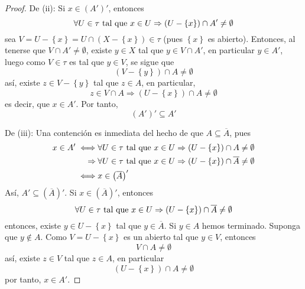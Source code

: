 \documentclass[12pt]{report}
\theoremstyle{largebreak}
\newcommand{\Cls}[1]{\ensuremath{\overline{#1}}}
\begin{document}
\begin{proof}
        De (ii): Si $x\in\left(A'\right)'$, entonces
        \begin{equation*}
            \forall U\in\tau\textup{ tal que }x\in U\Rightarrow \left(U-\left\{x\right\} \right)\cap A'\neq\emptyset
        \end{equation*}
        sea $V=U-\left\{x\right\}=U\cap(X-\left\{x\right\})\in\tau$ (pues $\left\{x\right\}$ es abierto). Entonces, al tenerse que $V\cap A'\neq\emptyset$, existe $y\in X$ tal que $y\in V\cap A'$, en particular $y\in A'$, luego como $V\in\tau$ es tal que $y\in V$, se sigue que
        \begin{equation*}
            (V-\left\{y\right\})\cap A\neq\emptyset
        \end{equation*} 
        así, existe $z\in V-\left\{y\right\}$ tal que $z\in A$, en particular,
        \begin{equation*}
            z\in V\cap A\Rightarrow (U-\left\{x\right\})\cap A\neq\emptyset
        \end{equation*}
        es decir, que $x\in A'$. Por tanto,
        \begin{equation*}
            \left(A'\right)'\subseteq A'
        \end{equation*}

        De (iii): Una contención es inmediata del hecho de que $A\subseteq\Cls{A}$, pues
        \begin{equation*}
            \begin{split}
                x\in A'\iff& \forall U\in\tau\textup{ tal que }x\in U\Rightarrow (U-\left\{x\right\})\cap A\neq\emptyset\\
                \Rightarrow\:&\forall U\in\tau\textup{ tal que }x\in U\Rightarrow (U-\left\{x\right\})\cap\Cls{A}\neq\emptyset\\
                \iff& x\in\left(\Cls{A}\right)'\\
            \end{split}
        \end{equation*}
        Así, $A'\subseteq\left(\Cls{A}\right)'$. Si $x\in\left(\Cls{A}\right)'$, entonces
        \begin{equation*}
            \forall U\in\tau\textup{ tal que }x\in U\Rightarrow (U-\left\{x\right\})\cap\Cls{A}\neq\emptyset
        \end{equation*}
        entonces, existe $y\in U-\left\{x\right\}$ tal que $y\in\Cls{A}$. Si $y\in A$ hemos terminado. Suponga que $y\notin A$. Como $V=U-\left\{x\right\}$ es un abierto tal que $y\in V$, entonces
        \begin{equation*}
            V\cap A\neq\emptyset
        \end{equation*}
        así, existe $z\in V$ tal que $z\in A$, en particular
        \begin{equation*}
            (U-\left\{x\right\})\cap A\neq\emptyset
        \end{equation*}
        por tanto, $x\in A'$.
    \end{proof}
\end{document}
